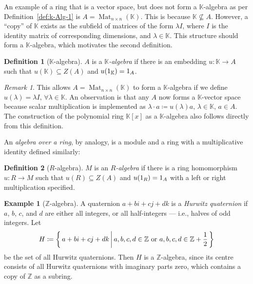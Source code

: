 \documentclass{article}
\theoremstyle{definition}
\newtheorem{Definition}{Definition}
\newtheorem*{Example*}{Example}
\theoremstyle{remark}
\newtheorem*{Remark*}{Remark}
\theoremstyle{underline}
\theoremstyle{underline}
\DeclareMathOperator{\Mat}{Mat}
\begin{document}
	An example of a ring that is a vector space, but does not form a $\mathbb K$-algebra as per Definition~\ref{def:k-Alg-1} is $A = \Mat_{n\times n}(\mathbb K)$. This is because $\mathbb K \not\subseteq A$. However, a ``copy'' of $\mathbb K$ exists as the subfield of matrices of the form $\lambda I$, where $I$ is the identity matrix of corresponding dimensions, and $\lambda \in \mathbb K$. This structure should form a $\mathbb K$-algebra, which motivates the second definition.
	
	\begin{Definition}[$\mathbb K$-algebra]
		$A$ is a $\mathbb K$\emph{-algebra} if there is an embedding $u \colon \mathbb K \to A$ such that $u(\mathbb K) \subseteq Z(A)$ and $u\pqty{1_{\mathbb K}} = 1_A $.
	\end{Definition}
	
	\begin{Remark*}
		This allows $A = \Mat_{n\times n}(\mathbb K)$ to form a $\mathbb K$-algebra if we define $u(\lambda) = \lambda I,\, \forall \lambda \in \mathbb K$. An observation is that any $A$ now forms a $\mathbb K$-vector space because scalar multiplication is implemented as $\lambda \cdot a \coloneqq u(\lambda)a,\, \lambda \in \mathbb K,\, a \in A$. The construction of the polynomial ring $\mathbb K[x]$ as a $\mathbb K$-algebra also follows directly from this definition.
	\end{Remark*}
	
	An \emph{algebra over a ring}, by analogy, is a module and a ring with a multiplicative identity defined similarly:
	
	\begin{Definition}[$R$-algebra]
		$M$ is an $R$\emph{-algebra} if there is a ring homomorphism $u \colon R \to M$ such that $u(R) \subseteq Z(A)$ and $u\pqty{1_{R}} = 1_A $ with a left or right multiplication specified.
	\end{Definition}
	
	\begin{Example*}[$\mathbb Z$-algebra]
		A quaternion $a + bi + cj + dk$ is a \emph{Hurwitz quaternion} if $a$, $b$, $c$, and $d$ are either all integers, or all half-integers --- i.e., halves of odd integers. Let
		\begin{gather*}
		H \coloneqq \qty{\, a + bi + cj + dk \,\bigg|\, a, b, c, d \in \mathbb Z\ \text{or}\ a, b, c, d \in \mathbb Z + \frac 1 2 \,}
		\end{gather*}
		be the set of all Hurwitz quaternions. Then $H$ is a $\mathbb Z$-algebra, since its centre consists of all Hurwitz quaternions with imaginary parts zero, which contains a copy of $\mathbb Z$ as a subring.
	\end{Example*}
	
\end{document}
